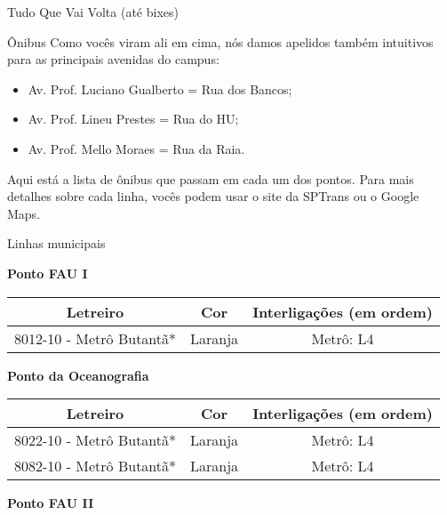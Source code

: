 \begin{secao}{Tudo Que Vai Volta (até bixes)}
\begin{subsecao}{Ônibus}
Como vocês viram ali em cima, nós damos apelidos também intuitivos para as
principais avenidas do campus:
\begin{itemize}
	\item Av. Prof. Luciano Gualberto = Rua dos Bancos;
	\item Av. Prof. Lineu Prestes = Rua do HU;
	\item Av. Prof. Mello Moraes = Rua da Raia.
\end{itemize}

Aqui está a lista de ônibus que passam em cada um dos pontos. Para mais detalhes
sobre cada linha, vocês podem usar o site da SPTrans ou o Google Maps.

\begin{subsubsecao}{Linhas municipais}

{\bf Ponto FAU I}

\begin{center}
	\begin{tabular}{|c|c|c|}
      \hline
	  Letreiro & Cor & Interligações (em ordem)\\
	  \hline
	  8012-10 - Metrô Butantã* & Laranja & Metrô: L4\\
      \hline
	\end{tabular}
\end{center}

{\bf Ponto da Oceanografia}

\begin{center}
	\begin{tabular}{|c|c|c|}
      \hline
	  Letreiro & Cor & Interligações (em ordem)\\
	  \hline
	  8022-10 - Metrô Butantã* & Laranja & Metrô: L4\\
   	  8082-10 - Metrô Butantã* & Laranja & Metrô: L4\\
      \hline
	\end{tabular}
\end{center}

{\bf Ponto FAU II}


\end{subsubsecao}
\end{subsecao}
\end{secao}

